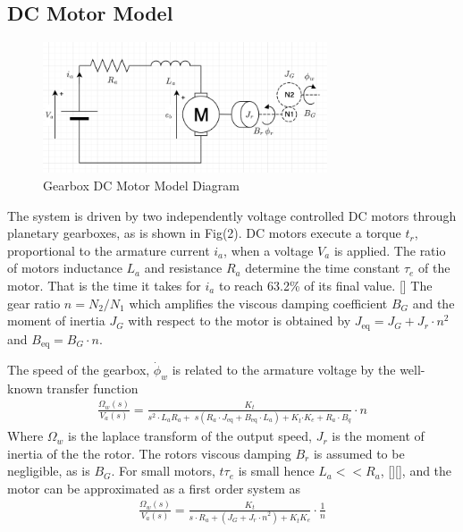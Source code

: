     \subsection{DC Motor Model}    
    \begin{figure}[H]
        \centering
            \includegraphics[width=0.75\textwidth]{DCMotorModel.png}
        \caption{Gearbox DC Motor Model Diagram}
    \end{figure}
    The system is driven by two independently voltage controlled DC motors through planetary gearboxes, 
    as is shown in Fig(2). 
    DC motors execute a torque $t_r$, proportional to the armature current $i_a$,
    when a voltage $V_a$ is applied.
    The ratio of motors inductance $L_a$ and resistance $R_a$ determine the time constant $\tau_e$ of the motor. 
    That is the time it takes for $i_a$ to reach 63.2\% of its final value. []
    The gear ratio $n=N_2/N_1$ which amplifies the viscous damping coefficient 
    $B_G$ and the moment of inertia $J_G$ with respect to the motor is obtained by
    $J_{\text{eq}} = J_G + J_r \cdot n^2$ and $B_{\text{eq}} = B_G \cdot n$.

    The speed of the gearbox, $\dot\phi_w$ is related to the armature voltage by the well-known transfer function
    \begin{equation}
        \begin{aligned}
            \frac{\Omega_w \left(s\right)}{V_a \left(s\right)}=\frac{K_t }{s^2 \cdot L_a R_a +\;s\left(R_a \cdot J_{\mathrm{eq}} +B_{\mathrm{eq}} \cdot L_a \right)+K_t {\cdot K}_e +R_a \cdot B_q }\cdot n
        \end{aligned}
    \end{equation}
    Where $\Omega_w$ is the laplace transform of the output speed, $J_r$ is the moment of inertia of the the rotor.
    The rotors viscous damping $B_r$ is assumed to be negligible, as is $B_G$. 
    For small motors, $t\tau_e$ is small hence $L_a << R_a$, [][], and the motor can be approximated as a first order system as
    \begin{equation}
        \begin{aligned}
            \frac{\Omega_w \left(s\right)}{V_a \left(s\right)}=\frac{K_t }{s\cdot R_a + \left(J_G +{J_r \cdot n}^2 \right)+K_t K_e }\cdot\frac{1}{n}
        \end{aligned}
    \end{equation}

